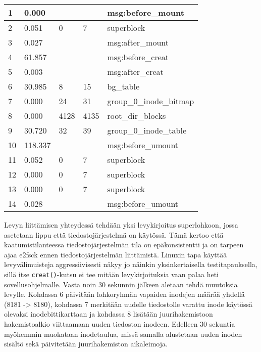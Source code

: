 \begin{table}
\begin{tabular}{l | l | l | l | l}
1  & 0.000    &      &      & msg:before\_mount              \\ \hline %
2  & 0.051    & 0    & 7    & superblock                     \\ \hline %
3  & 0.027    &      &      & msg:after\_mount               \\ \hline %
4  & 61.857   &      &      & msg:before\_creat              \\ \hline %
5  & 0.003    &      &      & msg:after\_creat               \\ \hline %
6  & 30.985   & 8    & 15   & bg\_table                      \\ \hline %
7  & 0.000    & 24   & 31   & group\_0\_inode\_bitmap        \\ \hline %
8  & 0.000    & 4128 & 4135 & root\_dir\_blocks              \\ \hline %
9  & 30.720   & 32   & 39   & group\_0\_inode\_table         \\ \hline %
10 & 118.337  &      &      & msg:before\_umount             \\ \hline %
11 & 0.052    & 0    & 7    & superblock                     \\ \hline %
12 & 0.000    & 0    & 7    & superblock                     \\ \hline %
13 & 0.000    & 0    & 7    & superblock                     \\ \hline %
14 & 0.028    &      &      & msg:before\_umount             \\ \hline %
\end{tabular}
\end{table}

Levyn liittämisen yhteydessä tehdään yksi levykirjoitus superlohkoon, jossa asetetaan lippu että tiedostojärjestelmä on käytössä.
Tämä kertoo että kaatumistilanteessa tiedostojärjestelmän tila on epäkonsistentti ja on tarpeen ajaa e2fsck ennen tiedostojärjestelmän liittämistä.
Linuxin tapa käyttää levyvälimuisteja aggressiivisesti näkyy jo näinkin yksinkertaisella testitapauksella,
sillä itse \texttt{creat()}-kutsu ei tee mitään levykirjoituksia vaan palaa heti sovellusohjelmalle.
Vasta noin 30 sekunnin jälkeen aletaan tehdä muutoksia levylle.
Kohdassa 6 päivitään lohkoryhmän vapaiden inodejen määrää yhdellä (8181 -> 8180), kohdassa 7 merkitään uudelle tiedostolle varattu inode käytössä olevaksi inodebittikarttaan
ja kohdassa 8 lisätään juurihakemistoon hakemistoalkio viittaamaan uuden tiedoston inodeen.
Edelleen 30 sekuntia myöhemmin muokataan inodetaulua, missä samalla alustetaan uuden inoden sisältö sekä päivitetään juurihakemiston aikaleimoja.

